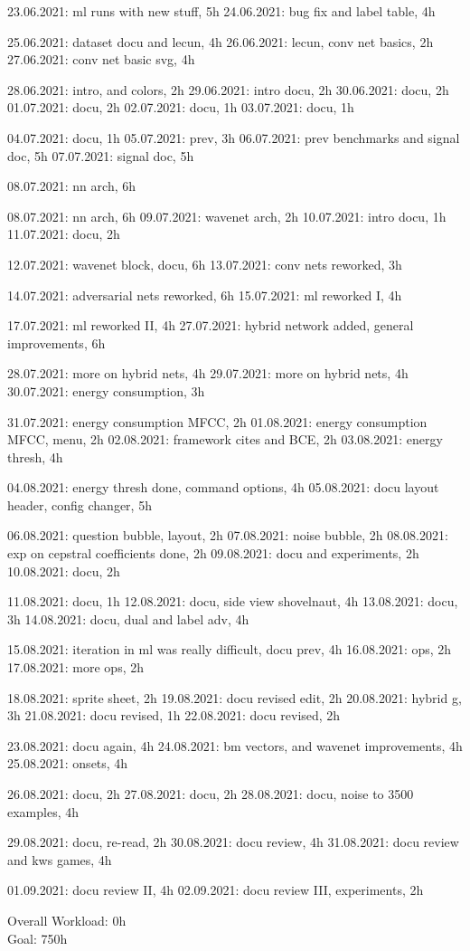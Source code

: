 23.06.2021: ml runs with new stuff, 5h
24.06.2021: bug fix and label table, 4h

25.06.2021: dataset docu and lecun, 4h
26.06.2021: lecun, conv net basics, 2h
27.06.2021: conv net basic svg, 4h

28.06.2021: intro, and colors, 2h
29.06.2021: intro docu, 2h
30.06.2021: docu, 2h
01.07.2021: docu, 2h
02.07.2021: docu, 1h
03.07.2021: docu, 1h

04.07.2021: docu, 1h
05.07.2021: prev, 3h
06.07.2021: prev benchmarks and signal doc, 5h 
07.07.2021: signal doc, 5h

08.07.2021: nn arch, 6h

08.07.2021: nn arch, 6h
09.07.2021: wavenet arch, 2h
10.07.2021: intro docu, 1h
11.07.2021: docu, 2h

12.07.2021: wavenet block, docu, 6h
13.07.2021: conv nets reworked, 3h

14.07.2021: adversarial nets reworked, 6h
15.07.2021: ml reworked I, 4h

17.07.2021: ml reworked II, 4h
27.07.2021: hybrid network added, general improvements, 6h

28.07.2021: more on hybrid nets, 4h
29.07.2021: more on hybrid nets, 4h
30.07.2021: energy consumption, 3h

31.07.2021: energy consumption MFCC, 2h
01.08.2021: energy consumption MFCC, menu, 2h
02.08.2021: framework cites and BCE, 2h
03.08.2021: energy thresh, 4h

04.08.2021: energy thresh done, command options, 4h
05.08.2021: docu layout header, config changer, 5h

06.08.2021: question bubble, layout, 2h
07.08.2021: noise bubble, 2h
08.08.2021: exp on cepstral coefficients done, 2h
09.08.2021: docu and experiments, 2h
10.08.2021: docu, 2h

11.08.2021: docu, 1h
12.08.2021: docu, side view shovelnaut, 4h
13.08.2021: docu, 3h
14.08.2021: docu, dual and label adv, 4h

15.08.2021: iteration in ml was really difficult, docu prev, 4h
16.08.2021: ops, 2h
17.08.2021: more ops, 2h

18.08.2021: sprite sheet, 2h
19.08.2021: docu revised edit, 2h
20.08.2021: hybrid g, 3h
21.08.2021: docu revised, 1h
22.08.2021: docu revised, 2h

23.08.2021: docu again, 4h
24.08.2021: bm vectors, and wavenet improvements, 4h
25.08.2021: onsets, 4h

26.08.2021: docu, 2h
27.08.2021: docu, 2h
28.08.2021: docu, noise to 3500 examples, 4h

29.08.2021: docu, re-read, 2h
30.08.2021: docu review, 4h
31.08.2021: docu review and kws games, 4h

01.09.2021: docu review II, 4h
02.09.2021: docu review III, experiments, 2h





\vspace{0.5cm}
\noindent
Overall Workload: 0h\\
Goal: 750h